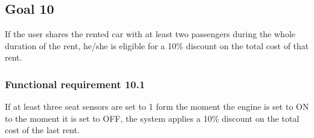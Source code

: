 \subsection{Goal 10}
If the user shares the rented car with at least two passengers during the whole duration of the rent, he/she is eligible for a 10\% discount on the total cost of that rent.

\setcounter{secnumdepth}{3}
\subsubsection{Functional requirement 10.1}
If at least three seat sensors are set to 1 form the moment the engine is set to ON to the moment it is set to OFF, the system applies a 10\% discount on the total cost of the last rent.